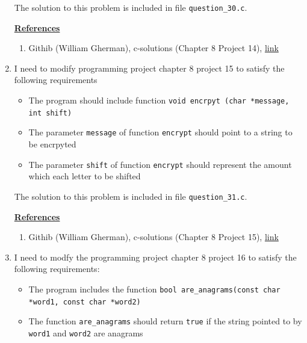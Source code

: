 \documentclass[12pt]{article}
\begin{document}
\begin{enumerate}[1.]
    \bigskip

    The solution to this problem is included in file \texttt{question\_30.c}.

    \bigskip

    \underline{\textbf{References}}

    \begin{enumerate}[1)]
        \item Githib (William Gherman), c-solutions (Chapter 8 Project 14), \href{https://github.com/williamgherman/c-solutions/blob/master/08/projects/14/14.c}{link}
    \end{enumerate}

    \item

    I need to modify programming project chapter 8 project 15 to satisfy the following requirements

    \begin{itemize}
        \item The program should include function \texttt{void encrpyt (char *message, int shift)}
        \item The parameter \texttt{message} of function \texttt{encrypt} should point to a string to be encrpyted
        \item The parameter \texttt{shift} of function \texttt{encrypt} should represent the amount which each letter to be shifted
    \end{itemize}

    \bigskip

    The solution to this problem is included in file \texttt{question\_31.c}.

    \bigskip

    \underline{\textbf{References}}

    \begin{enumerate}[1)]
        \item Githib (William Gherman), c-solutions (Chapter 8 Project 15), \href{https://github.com/williamgherman/c-solutions/blob/master/08/projects/15/15.c}{link}
    \end{enumerate}

    \item

    I need to modfy the programming project chapter 8 project 16 to satisfy the following requirements:

    \begin{itemize}
        \item The program includes the function \texttt{bool are\_anagrams(const char *word1, const char *word2)}
        \item The function \texttt{are\_anagrams} should return \texttt{true} if the string pointed to by \texttt{word1}
        and \texttt{word2} are anagrams
    \end{itemize}


\end{enumerate}
\end{document}
